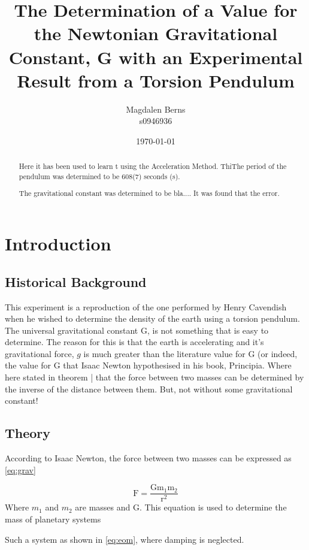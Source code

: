 \documentclass[12pt]{article}
\title{The Determination of a Value for the Newtonian Gravitational Constant, G with an Experimental Result from a Torsion Pendulum}
\author{Magdalen Berns
\\
s0946936 \\}
\date{\today}
\begin{document}
\maketitle
\thispagestyle{empty}

\begin{abstract}
\noindent
Here it has been used to learn t using the Acceleration Method. ThiThe period of the pendulum was determined to be 608(7) seconds (s). 

The gravitational constant was determined to be bla.... It was found that the error.
 \end{abstract}

\clearpage
\tableofcontents
\thispagestyle{empty}
\clearpage

\section{Introduction}

\subsection{Historical Background}

This experiment is a reproduction of the one performed by Henry Cavendish when he wished to determine the density of the earth using a torsion pendulum. The universal gravitational constant G, is not something that is easy to determine. The reason for this is that the earth is accelerating and it's gravitational force, $g$ is much greater than the literature value for G (or indeed, the value for G that Isaac Newton hypothesised in his book, Principia. Where here stated in theorem | that the force between two masses can be determined by the inverse of the distance between them. But, not without some gravitational constant! 


\subsection{Theory}

According to Isaac Newton, the force between two masses can be expressed as \cref{eq:grav}

\begin{equation}
\label{eq:grav}
\mathrm{F=\frac{G m_{1} m_{2}}{r^{2}}}
\end{equation}
\noindent 
Where $m_{1}$ and $m_{2}$ are masses and G. This equation is used to determine the mass of planetary systems 

\noindent 
Such a system as shown in \cref{eq:eom}, where damping is neglected.
\end{document}
